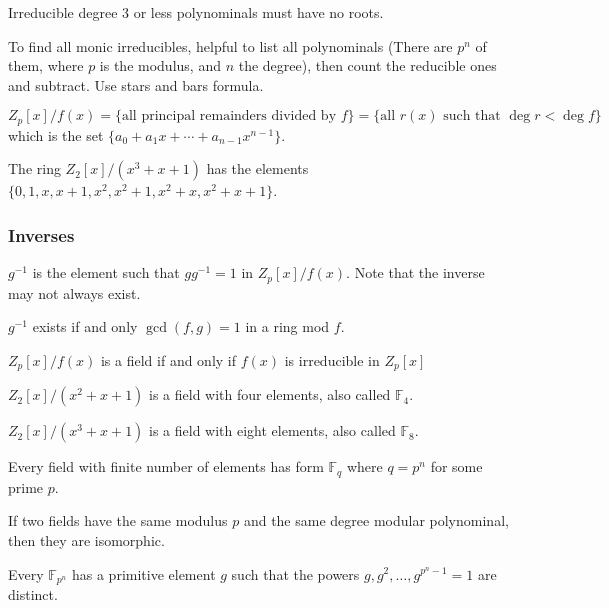 \documentclass{article}
\begin{document}
\begin{corollary}
  Irreducible degree 3 or less polynominals must have no roots.
\end{corollary}
\begin{remark}
  To find all monic irreducibles, helpful to list all polynominals
  (There are \( p^{n} \) of them, where \( p \) is the modulus, and
  \( n \) the degree), then count the reducible ones and subtract.
  Use stars and bars formula.
\end{remark}
\begin{definition}
  \( Z_p[x]/ f(x) = \{\text{all principal remainders divided by }f\}
  =  \{\text{all }r(x) \text{ such that } \deg r < \deg f \} \) which
  is the set \( \{a_0 + a_1x + \cdots + a_{n-1}x^{n-1} \}  \).
\end{definition}
\begin{example}
  The ring \( Z_2[x]/(x^3+x+1) \) has the elements \( \{0, 1, x, x+1,
  x^2, x^2+1, x^2 + x, x^2 + x + 1 \}\).
\end{example}
\subsubsection{Inverses}
\begin{definition}
  \( g^{-1} \) is the element such that \( gg^{-1} = 1 \) in \(
  Z_p[x]/f(x) \). Note that the inverse may not always exist.
\end{definition}
\begin{theorem}
  \( g^{-1} \) exists if and only \( \gcd(f, g) = 1 \) in a ring mod \( f \).
\end{theorem}
\begin{theorem}
  \( Z_p[x]/f(x) \) is a field if and only if \( f(x) \) is
  irreducible in \( Z_p[x] \)
\end{theorem}
\begin{example}
  \( Z_2[x] /(x^2+x+1) \) is a field with four elements, also called
  \( \mathbb{F}_4 \).

  \( Z_2[x]/(x^3+x+1) \) is a field with eight elements, also called
  \( \mathbb{F}_8 \).
\end{example}
\begin{proposition}
  Every field with finite number of elements has form \( \mathbb{F}_q
  \) where \( q = p^n \) for some prime \( p \).
\end{proposition}
\begin{remark}
  If two fields have the same modulus \( p \) and the same degree
  modular polynominal, then they are isomorphic.
\end{remark}
\begin{proposition}
  Every \( \mathbb{F}_{p^n} \) has a primitive element \( g \) such
  that the powers \( g, g^2, \dots, g^{p^n-1} = 1  \) are distinct.
\end{proposition}
\end{document}
